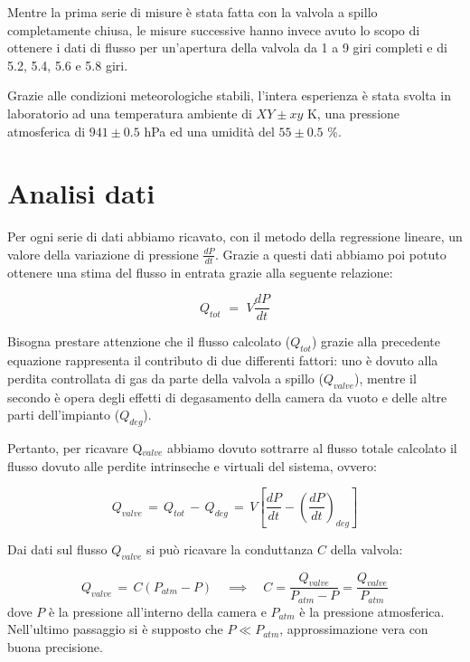 Mentre la prima serie di misure è stata fatta con la valvola a spillo completamente chiusa, le misure successive hanno invece avuto lo scopo di ottenere i dati di flusso per un'apertura della valvola da 1 a 9 giri completi e di 5.2, 5.4, 5.6 e 5.8 giri.

Grazie alle condizioni meteorologiche stabili, l'intera esperienza è stata svolta in laboratorio ad una temperatura ambiente di $XY \pm xy$ \si{\kelvin}, una pressione atmosferica di $941 \pm 0.5$ hPa ed una umidità del $55 \pm 0.5$ \%.

\section{Analisi dati}

Per ogni serie di dati abbiamo ricavato, con il metodo della regressione lineare, un valore della variazione di pressione $\frac{dP}{dt}$. Grazie a questi dati abbiamo poi potuto ottenere una stima del flusso in entrata grazie alla seguente relazione:

\begin{equation}
	Q_{tot} \,\, = \,\, V \frac{dP}{dt}
\end{equation}

Bisogna prestare attenzione che il flusso calcolato ($Q_{tot}$) grazie alla precedente equazione rappresenta il contributo di due differenti fattori: uno è dovuto alla perdita controllata di gas da parte della valvola a spillo ($Q_{valve}$), mentre il secondo è opera degli effetti di degasamento della camera da vuoto e delle altre parti dell'impianto ($Q_{deg}$).

Pertanto, per ricavare Q$_{valve}$ abbiamo dovuto sottrarre al flusso totale calcolato il flusso  dovuto alle perdite intrinseche e virtuali del sistema, ovvero:

\begin{equation}
	Q_{valve} \, = \, Q_{tot} \, - \, Q_{deg} \, = \, V \left[ \frac{dP}{dt} - \left(\frac{dP}{dt}\right)_{deg} \right]
\end{equation}

Dai dati sul flusso $Q_{valve}$ si può ricavare la conduttanza $C$ della valvola:

\begin{equation}
	Q_{valve} \, = \, C (P_{atm} - P) \quad \implies \quad C = \frac{Q_{valve}}{P_{atm} - P} = \frac{Q_{valve}}{P_{atm}}
\end{equation}
%
dove $P$ è la pressione all'interno della camera e $P_{atm}$ è la pressione atmosferica. Nell'ultimo passaggio si è supposto
che $P \ll P_{atm}$, approssimazione vera con buona precisione.

